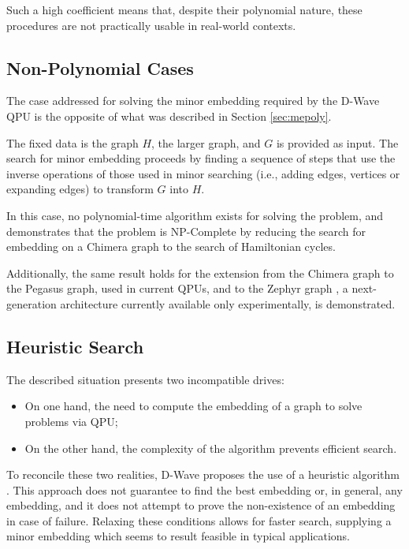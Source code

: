 Such a high coefficient means that, despite their polynomial nature, these procedures are not practically usable in real-world contexts.

\subsection{Non-Polynomial Cases}\label{sec:menopoly}

The case addressed for solving the minor embedding required by the D-Wave QPU is the opposite of what was described in Section \ref{sec:mepoly}.

The fixed data is the graph $H$, the larger graph, and $G$ is provided as input. 
The search for minor embedding proceeds by finding a sequence of steps that use the inverse operations of those used in minor searching (i.e., adding edges, vertices or expanding edges) to transform $G$ into $H$.

In this case, no polynomial-time algorithm exists for solving the problem, and \cite{MENP} demonstrates that the problem is NP-Complete by reducing the search for embedding on a Chimera graph \cite{QPU} to the search of Hamiltonian cycles.

Additionally, the same result holds for the extension from the Chi\-mera graph to the Pegasus graph, used in current QPUs, and to the Zephyr graph \cite{QPU2}, a next-generation architecture currently available only experimentally, is demonstrated.

\subsection{Heuristic Search}\label{sec:medwave}

The described situation presents two incompatible drives:
\begin{itemize}
    \item On one hand, the need to compute the embedding of a graph to solve problems via QPU;
    \item On the other hand, the complexity of the algorithm prevents efficient search.
\end{itemize}

To reconcile these two realities, D-Wave proposes the use of a heuristic algorithm \cite{MEdwave}. 
This approach does not guarantee to find the best embedding or, in general, any embedding, and it does not attempt to prove the non-existence of an embedding in case of failure. 
Relaxing these conditions allows for faster search, supplying a minor embedding which seems to result feasible in typical applications.

